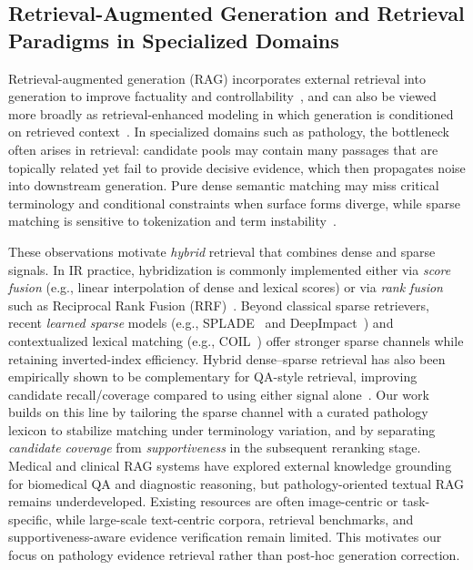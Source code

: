 \documentclass[preprint,12pt,a4paper]{elsarticle}
\begin{document}
\subsection{Retrieval-Augmented Generation and Retrieval Paradigms in Specialized Domains}
Retrieval-augmented generation (RAG) incorporates external retrieval into generation to improve factuality and controllability~\cite{lewis2020rag,izacard2021leveraging,gao2023ragsurvey}, and can also be viewed more broadly as retrieval-enhanced modeling in which generation is conditioned on retrieved context~\cite{guu2020realm}.
In specialized domains such as pathology, the bottleneck often arises in retrieval: candidate pools may contain many passages that are topically related yet fail to provide decisive evidence, which then propagates noise into downstream generation.
Pure dense semantic matching may miss critical terminology and conditional constraints when surface forms diverge, while sparse matching is sensitive to tokenization and term instability~\cite{robertson2009bm25}.

These observations motivate \emph{hybrid} retrieval that combines dense and sparse signals.
In IR practice, hybridization is commonly implemented either via \emph{score fusion} (e.g., linear interpolation of dense and lexical scores) or via \emph{rank fusion} such as Reciprocal Rank Fusion (RRF)~\cite{cormack2009rrf}.
Beyond classical sparse retrievers, recent \emph{learned sparse} models (e.g., SPLADE~\cite{formal2021splade} and DeepImpact~\cite{mallia2021deepimpact}) and contextualized lexical matching (e.g., COIL~\cite{gao2021coil}) offer stronger sparse channels while retaining inverted-index efficiency.
Hybrid dense--sparse retrieval has also been empirically shown to be complementary for QA-style retrieval, improving candidate recall/coverage compared to using either signal alone~\cite{karpukhin2020dpr}.
Our work builds on this line by tailoring the sparse channel with a curated pathology lexicon to stabilize matching under terminology variation, and by separating \emph{candidate coverage} from \emph{supportiveness} in the subsequent reranking stage.
Medical and clinical RAG systems have explored external knowledge grounding for biomedical QA and diagnostic reasoning, but pathology-oriented textual RAG remains underdeveloped.
Existing resources are often image-centric or task-specific, while large-scale text-centric corpora, retrieval benchmarks, and supportiveness-aware evidence verification remain limited.
This motivates our focus on pathology evidence retrieval rather than post-hoc generation correction.
\end{document}
